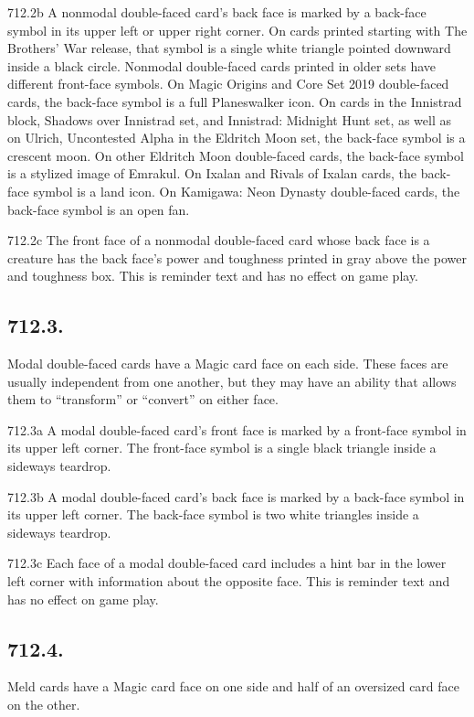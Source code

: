 712.2b A nonmodal double-faced card’s back face is marked by a back-face symbol in its upper left or upper right corner. On cards printed starting with The Brothers’ War release, that symbol is a single white triangle pointed downward inside a black circle. Nonmodal double-faced cards printed in older sets have different front-face symbols. On Magic Origins and Core Set 2019 double-faced cards, the back-face symbol is a full Planeswalker icon. On cards in the Innistrad block, Shadows over Innistrad set, and Innistrad: Midnight Hunt set, as well as on Ulrich, Uncontested Alpha in the Eldritch Moon set, the back-face symbol is a crescent moon. On other Eldritch Moon double-faced cards, the back-face symbol is a stylized image of Emrakul. On Ixalan and Rivals of Ixalan cards, the back-face symbol is a land icon. On Kamigawa: Neon Dynasty double-faced cards, the back-face symbol is an open fan.

712.2c The front face of a nonmodal double-faced card whose back face is a creature has the back face’s power and toughness printed in gray above the power and toughness box. This is reminder text and has no effect on game play.

\subsection*{712.3.}
Modal double-faced cards have a Magic card face on each side. These faces are usually independent from one another, but they may have an ability that allows them to “transform” or “convert” on either face.

712.3a A modal double-faced card’s front face is marked by a front-face symbol in its upper left corner. The front-face symbol is a single black triangle inside a sideways teardrop.

712.3b A modal double-faced card’s back face is marked by a back-face symbol in its upper left corner. The back-face symbol is two white triangles inside a sideways teardrop.

712.3c Each face of a modal double-faced card includes a hint bar in the lower left corner with information about the opposite face. This is reminder text and has no effect on game play.

\subsection*{712.4.}
Meld cards have a Magic card face on one side and half of an oversized card face on the other.

